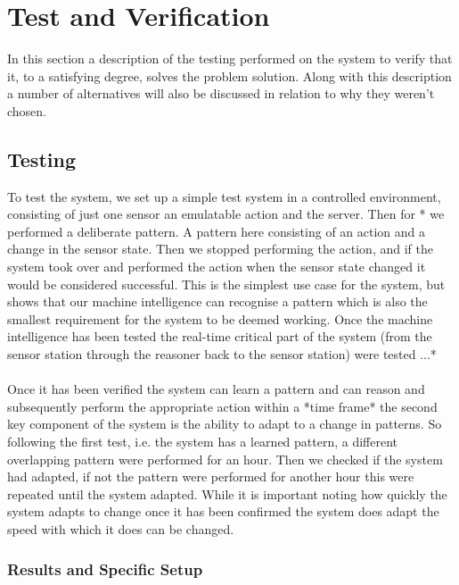 \chapter{Test and Verification}
In this section a description of the testing performed on the system to verify that it, to a satisfying degree, solves the problem solution. Along with this description a number of alternatives will also be discussed in relation to why they weren't chosen.

\section{Testing}
To test the system, we set up a simple test system in a controlled environment, consisting of just one sensor an emulatable action and the server. Then for * we performed a deliberate pattern. A pattern here consisting of an action and a change in the sensor state. Then we stopped performing the action, and if the system took over and performed the action when the sensor state changed it would be considered successful. This is the simplest use case for the system, but shows that our machine intelligence can recognise a pattern which is also the smallest requirement for the system to be deemed working. Once the machine intelligence has been tested the real-time critical part of the system (from the sensor station through the reasoner back to the sensor station) were tested ...*
\\\\
Once it has been verified the system can learn a pattern and can reason and subsequently perform the appropriate action within a *time frame* the second key component of the system is the ability to adapt to a change in patterns. So following the first test, i.e. the system has a learned pattern, a different overlapping pattern were performed for an hour. Then we checked if the system had adapted, if not the pattern were performed for another hour this were repeated until the system adapted. While it is important noting how quickly the system adapts to change once it has been confirmed the system does adapt the speed with which it does can be changed.
\subsection{Results and Specific Setup}


